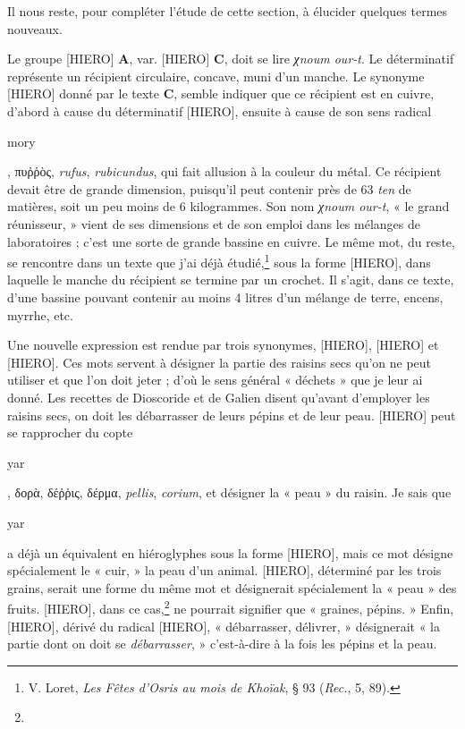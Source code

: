 \documentclass[a4paper, 11pt, oneside]{article}
\begin{document}
Il nous reste, pour compléter l'étude de cette section, à élucider quelques termes nouveaux.

Le groupe [HIERO] \textbf{A}, var. [HIERO] \textbf{C}, doit se lire \emph{χnoum our-t}. Le déterminatif représente un récipient circulaire, concave, muni d'un manche. Le synonyme [HIERO] donné par le texte \textbf{C}, semble indiquer que ce récipient est en cuivre, d'abord à cause du déterminatif [HIERO], ensuite à cause de son sens radical \begin{coptic}mory\end{coptic}, πυῤῥὸς, \emph{rufus}, \emph{rubicundus}, qui fait allusion à la couleur du métal. Ce récipient devait être de grande dimension, puisqu'il peut contenir près de 63 \emph{ten} de matières, soit un peu moins de 6 kilogrammes. Son nom \emph{χnoum our-t}, « le grand réunisseur, » vient de ses dimensions et de son emploi dans les mélanges de laboratoires ; c'est une sorte de grande bassine en cuivre. Le même mot, du reste, se rencontre dans un texte que j'ai déjà étudié,\footnote{V. Loret, \emph{Les Fêtes d'Osris au mois de Khoïak}, § 93 (\emph{Rec.}, 5, 89).} sous la forme [HIERO], dans laquelle le manche du récipient se termine par un crochet. Il s'agit, dans ce texte, d'une bassine pouvant contenir au moins 4 litres d'un mélange de terre, encens, myrrhe, etc.

Une nouvelle expression est rendue par trois synonymes, [HIERO], [HIERO] et [HIERO]. Ces mots servent à désigner la partie des raisins secs qu'on ne peut utiliser et que l'on doit jeter ; d'où le sens général « déchets » que je leur ai donné. Les recettes de Dioscoride et de Galien disent qu'avant d'employer les raisins secs, on doit les débarrasser de leurs pépins et de leur peau. [HIERO] peut se rapprocher du copte \begin{coptic}yar\end{coptic}, δορὰ, δέῤῥις, δέρμα, \emph{pellis}, \emph{corium}, et désigner la « peau » du raisin. Je sais que \begin{coptic}yar\end{coptic} a déjà un équivalent en hiéroglyphes sous la forme [HIERO], mais ce mot désigne spécialement le « cuir, » la peau d'un animal. [HIERO], déterminé par les trois grains, serait une forme du même mot et désignerait spécialement la « peau » des fruits. [HIERO], dans ce cas,\footnote{} ne pourrait signifier que « graines, pépins. » Enfin, [HIERO], dérivé du radical [HIERO], « débarrasser, délivrer, » désignerait « la partie dont on doit se \emph{débarrasser}, » c'est-à-dire à la fois les pépins et la peau.
\end{document}
